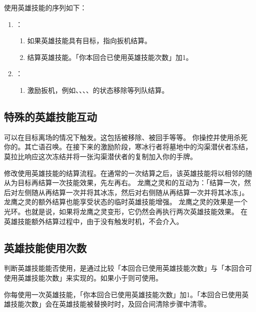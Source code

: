 使用英雄技能的序列如下：
\begin{enumerate}
    \item {}：
    \begin{enumerate}
        \item 如果英雄技能具有目标，指向扳机结算。
        \item 结算英雄技能。「你本回合已使用英雄技能次数」加1。
    \end{enumerate}

    \item {}：
    \begin{enumerate}
        \item 激励扳机，例如、、、、的状态移除等列队结算。
    \end{enumerate}
\end{enumerate}

\subsection{特殊的英雄技能互动}

可以在目标离场的情况下触发。这包括被移除、被回手等等。
\example 你操控并使用杀死你的。其亡语召唤。在接下来的激励阶段，寒冰行者将墓地中的沟渠潜伏者冻结，莫拉比响应这次冻结并将一张沟渠潜伏者的复制加入你的手牌。

修改使用英雄技能的结算流程。在通常的一次结算之后，该英雄技能将以相邻的随从为目标再结算一次技能效果，先左再右。
\notice 龙鹰之灵和的互动为：「结算一次，然后对左侧随从再结算一次并将其冰冻，然后对右侧随从再结算一次并将其冰冻」。
\notice 龙鹰之灵的额外结算也能享受状态的临时英雄技能增强。
\notice 龙鹰之灵的效果是一个光环。也就是说，如果将龙鹰之灵变形，它仍然会再执行两次英雄技能效果。
\notice 在英雄技能额外结算过程中，由于没有触发时机，不会介入。

\subsection{英雄技能使用次数}

判断英雄技能能否使用，是通过比较「本回合已使用英雄技能次数」与「本回合可使用英雄技能次数」来实现的。如果小于则可使用。

你每使用一次英雄技能，「你本回合已使用英雄技能次数」加1。「本回合已使用英雄技能次数」会在英雄技能被替换时时，及回合间清除步骤中清零。

